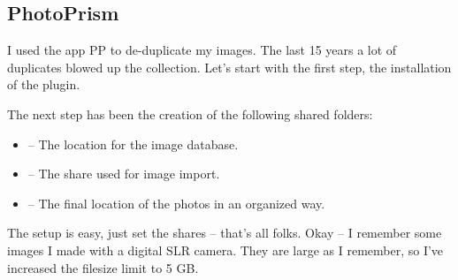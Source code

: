 

\subsection{PhotoPrism}

I used the app \gls{PP} to de-duplicate my images. The last 15 years a lot of
duplicates blowed up the collection. Let's start with the first step, the
installation of the plugin.


The next step has been the creation of the following shared folders:

\begin{itemize}
    \item {} -- The location for the image database.
    \item {} -- The share used for image import.
    \item {}  -- The final location of the photos in an organized way.
\end{itemize}


The setup is easy, just set the shares -- that's all folks. Okay -- I remember
some images I made with a digital SLR camera. They are large as I remember, so
I've increased the filesize limit to 5 GB.

